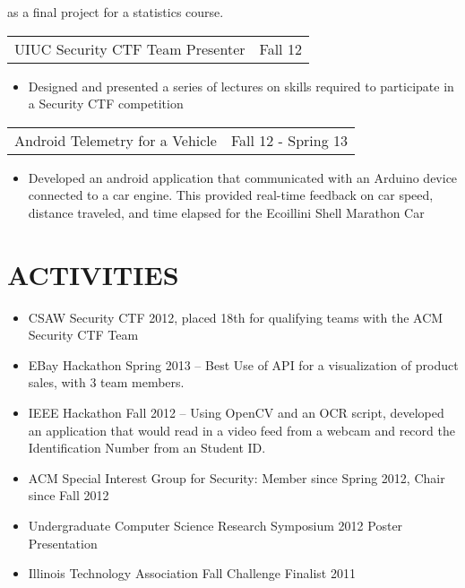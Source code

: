 \documentclass[margin]{res}
\begin{document}
\begin{resume}
\begin{itemize}
  as a final project for a statistics course.
\end{itemize}
\begin{tabular}{p{3in} r} %
UIUC Security CTF Team Presenter & Fall 12
\end{tabular}
\begin{itemize} \itemsep -2pt
\item  Designed and presented a series of lectures on skills required to
  participate in a Security CTF competition
\end{itemize}
\begin{tabular}{p{3in} r} %
Android Telemetry for a Vehicle & Fall 12 - Spring 13
\end{tabular}
\begin{itemize} \itemsep -2pt
\item Developed an android application that communicated with an
  Arduino device connected to a car engine.  This provided real-time
  feedback on car speed, distance traveled, and time elapsed for the
  Ecoillini Shell Marathon Car
\end{itemize}

\section{ACTIVITIES}
\begin{itemize} \itemsep -2pt
\item CSAW Security CTF 2012, placed 18th for qualifying teams with
  the ACM Security CTF Team
\item EBay Hackathon Spring 2013 -- Best Use of API for a visualization of product
  sales, with 3 team members.
\item IEEE Hackathon Fall 2012 -- Using OpenCV and an OCR script,
  developed an application that would read in a video feed from a
  webcam and record the Identification Number from an Student ID.
\item ACM Special Interest Group for Security: Member since Spring
  2012, Chair since Fall 2012
\item Undergraduate Computer Science Research Symposium 2012 Poster Presentation
\item Illinois Technology Association Fall Challenge Finalist 2011
\end{itemize}
\end{resume}
\end{document}
